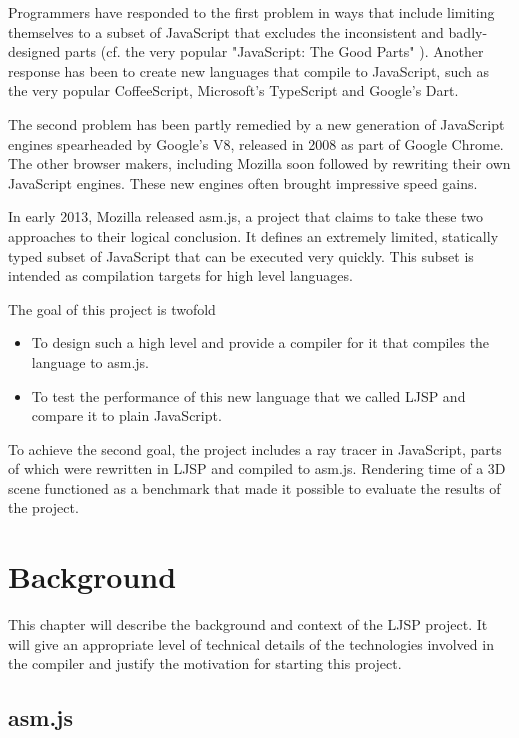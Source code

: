\documentclass[11pt]{report}
\begin{document}
Programmers have responded to the first problem in ways that include limiting themselves to a subset of JavaScript that excludes the inconsistent and badly-designed parts (cf. the very popular "JavaScript: The Good Parts" \cite{jsgoodparts}). Another response has been to create new languages that compile to JavaScript, such as the very popular CoffeeScript, Microsoft's TypeScript and Google's Dart.

The second problem has been partly remedied by a new generation of JavaScript engines spearheaded by Google's V8, released in 2008 as part of Google Chrome. The other browser makers, including Mozilla soon followed by rewriting their own JavaScript engines. These new engines often brought impressive speed gains.

In early 2013, Mozilla released asm.js, a project that claims to take these two approaches to their logical conclusion. It defines an extremely limited, statically typed subset of JavaScript that can be executed very quickly. This subset is intended as compilation targets for high level languages.

The goal of this project is twofold
\begin{itemize}
\item To design such a high level and provide a compiler for it that compiles the language to asm.js.
\item To test the performance of this new language that we called LJSP and compare it to plain JavaScript.
\end{itemize}

To achieve the second goal, the project includes a ray tracer in JavaScript, parts of which were rewritten in LJSP and compiled to asm.js. Rendering time of a 3D scene functioned as a benchmark that made it possible to evaluate the results of the project.


\chapter{Background}
This chapter will describe the background and context of the LJSP project. It will give an appropriate level of technical details of the technologies involved in the compiler and justify the motivation for starting this project.

\section{asm.js}
\end{document}
